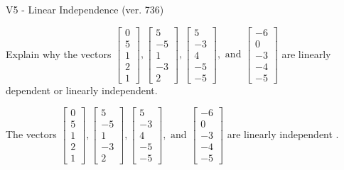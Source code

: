 \begin{exercise}
  \begin{exerciseTitle}V5 - Linear Independence (ver. 736)\end{exerciseTitle}
  \begin{exerciseStatement}
    Explain why the vectors \(\left[\begin{array}{r}
0 \\
5 \\
1 \\
2 \\
1
\end{array}\right] , \left[\begin{array}{r}
5 \\
-5 \\
1 \\
-3 \\
2
\end{array}\right] , \left[\begin{array}{r}
5 \\
-3 \\
4 \\
-5 \\
-5
\end{array}\right] , \text{ and } \left[\begin{array}{r}
-6 \\
0 \\
-3 \\
-4 \\
-5
\end{array}\right]\) are linearly dependent or linearly independent.	


  \end{exerciseStatement}
  \begin{exerciseAnswer}
   The vectors \(\left[\begin{array}{r}
0 \\
5 \\
1 \\
2 \\
1
\end{array}\right] , \left[\begin{array}{r}
5 \\
-5 \\
1 \\
-3 \\
2
\end{array}\right] , \left[\begin{array}{r}
5 \\
-3 \\
4 \\
-5 \\
-5
\end{array}\right] , \text{ and } \left[\begin{array}{r}
-6 \\
0 \\
-3 \\
-4 \\
-5
\end{array}\right]\) are 
  	 linearly independent  .
  


  \end{exerciseAnswer}
\end{exercise}